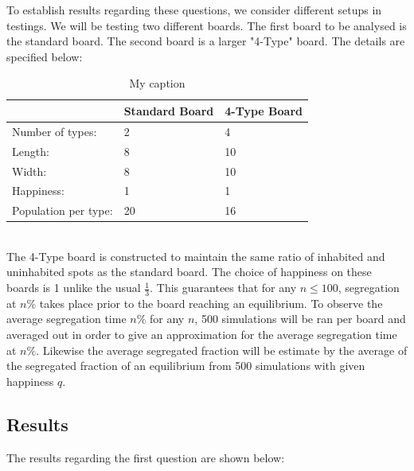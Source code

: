 \documentclass{article}
\begin{document}
To establish results regarding these questions, we consider different setups in testings. We will be testing two different boards.
The first board to be analysed is the standard board. The second board is a larger 
"4-Type" board. The details are specified below:
\begin{table}[h!]
\centering
\caption{My caption}
\label{my-label}
\begin{tabular}{l|l|l}
  & Standard Board & 4-Type Board\\ \hline
Number of types:& 2 & 4 \\ 
 Length:& 8 & 10  \\
 Width:& 8 & 10  \\
 Happiness:& 1 & 1  \\
Population per type: & 20 & 16  
	\end{tabular}
	\end{table}
\\
The 4-Type board is constructed to maintain the same ratio of inhabited and uninhabited spots as the standard board. The choice of happiness on these boards is 1 unlike the usual \(\frac{1}{3}\). 
This guarantees that for any \(n\leq 100\), segregation at \(n\%\) takes place prior to the board reaching an equilibrium. 
To observe the average segregation time \(n\%\) for any \(n\), 500 simulations will be ran per board and averaged out in order to give an approximation for the average segregation time at \(n\%\).
Likewise the average segregated fraction will be estimate by the average of the segregated fraction of an equilibrium from 500 simulations with given happiness \(q\).
\newpage
\subsection{Results}
The results regarding the first question are shown below:\\
\end{document}
